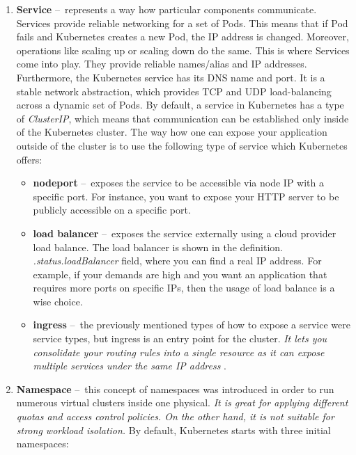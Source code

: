 \begin{enumerate}[itemsep=1mm, parsep=0pt]
    \item \textbf{Service} \---\ represents a way how particular components communicate. Services provide reliable networking for a set of Pods. This means that if Pod fails and Kubernetes creates a new Pod, the IP address is changed. Moreover, operations like scaling up or scaling down do the same. This is where Services come into play. They provide reliable names/alias and IP addresses. Furthermore, the Kubernetes service has its DNS name and port. It is a stable network abstraction, which provides TCP and UDP load-balancing across a dynamic set of Pods. By default, a service in Kubernetes has a type of \emph{ClusterIP}, which means that communication can be established only inside of the Kubernetes cluster. The way how one can expose your application outside of the cluster is to use the following type of service which Kubernetes offers:
         \begin{itemize}[itemsep=1mm, parsep=0pt]
            \item \textbf{nodeport} \---\ exposes the service to be accessible via node IP with a specific port. For instance, you want to expose your HTTP server to be publicly accessible on a specific port.
            \item \textbf{load balancer} \---\  exposes the service externally using a cloud provider load balance. The load balancer is shown in the definition. \emph{.status.loadBalancer} field, where you can find a real IP address. For example, if your demands are high and you want an application that requires more ports on specific IPs, then the usage of load balance is a wise choice.
            \item \textbf{ingress} \---\  the previously mentioned types of how to expose a service were service types, but ingress is an entry point for the cluster. \textit{It lets you consolidate your routing rules into a single resource as it can expose multiple services under the same IP address} \cite{ingress}.
        \end{itemize}
        
    \item \textbf{Namespace} \---\ this concept of namespaces was introduced in order to run numerous virtual clusters inside one physical. \emph{It is great for applying different quotas and access control policies. On the other hand, it is not suitable for strong workload isolation.} By default, Kubernetes starts with three initial namespaces:


\end{enumerate}
